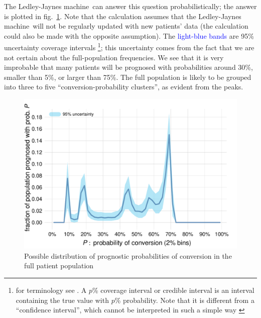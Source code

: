 \documentclass[utf8]{FrontiersinHarvard_mod} %
\newcommand*{\sect}{\S}%
\newcommand*{\fig}{fig.}%
\renewcommand*{\|}[1][]{\nonscript\:#1\vert\nonscript\:\mathopen{}}
\newcommand*{\ljm}{Ledley-Jaynes machine}
\begin{document}
The \ljm\ can answer this question probabilistically; the answer is plotted in \fig~\ref{fig:progn_probs}. Note that the calculation assumes that the \ljm\ will not be regularly updated with new patients' data (the calculation could also be made with the opposite assumption). The \textcolor{blue}{light-blue bands} are 95\% uncertainty coverage intervals \footnote{for terminology see \citet[C.2.30]{jcgm1993_r2008}. A $p$\% coverage interval or credible interval is an interval containing the true value with $p$\% probability. Note that it is different from a \enquote{confidence interval}, which cannot be interpreted in such a simple way \citetext{\citealp[pp.~165--166]{pratt1961}; \citealp{jaynes1976}; \citealp[\sect\,37.3]{mackay1995_r2005}}}; this uncertainty comes from the fact that we are not certain about the full-population frequencies. We see that it is very improbable that many patients will be prognosed with probabilities around 30\%, smaller than 5\%, or larger than 75\%. The full population is likely to be grouped into three to five \enquote{conversion-probability clusters}, as evident from the peaks. %
\begin{figure}[b]%
  \centering%
\includegraphics[width=0.75\linewidth]{plotnextpatientconvprob.pdf}%
  \caption{Possible distribution of prognostic probabilities of conversion in the full patient population}\label{fig:progn_probs}
\end{figure}%
\end{document}
